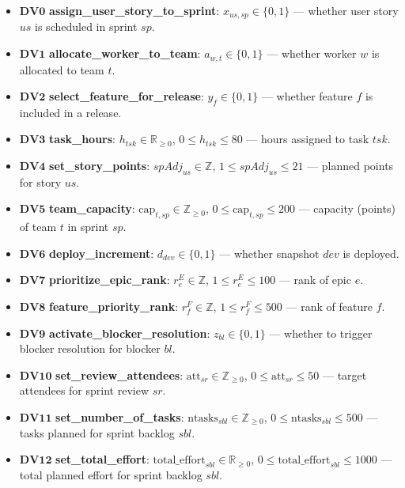 \documentclass[11pt,a4paper]{article}
\begin{document}
\begin{itemize}[leftmargin=2em,label=\(\triangleright\)]
  \item \(\mathbf{DV0}\) \textbf{assign\_user\_story\_to\_sprint}: \(x_{us,sp} \in \{0,1\}\) — whether user story \(us\) is scheduled in sprint \(sp\).
  \item \(\mathbf{DV1}\) \textbf{allocate\_worker\_to\_team}: \(a_{w,t} \in \{0,1\}\) — whether worker \(w\) is allocated to team \(t\).
  \item \(\mathbf{DV2}\) \textbf{select\_feature\_for\_release}: \(y_f \in \{0,1\}\) — whether feature \(f\) is included in a release.
  \item \(\mathbf{DV3}\) \textbf{task\_hours}: \(h_{tsk} \in \mathbb{R}_{\ge 0}\), \(0 \le h_{tsk} \le 80\) — hours assigned to task \(tsk\).
  \item \(\mathbf{DV4}\) \textbf{set\_story\_points}: \(spAdj_{us} \in \mathbb{Z}\), \(1 \le spAdj_{us} \le 21\) — planned points for story \(us\).
  \item \(\mathbf{DV5}\) \textbf{team\_capacity}: \(\text{cap}_{t,sp} \in \mathbb{Z}_{\ge 0}\), \(0 \le \text{cap}_{t,sp} \le 200\) — capacity (points) of team \(t\) in sprint \(sp\).
  \item \(\mathbf{DV6}\) \textbf{deploy\_increment}: \(d_{dev} \in \{0,1\}\) — whether snapshot \(dev\) is deployed.
  \item \(\mathbf{DV7}\) \textbf{prioritize\_epic\_rank}: \(r^{E}_{e} \in \mathbb{Z}\), \(1 \le r^{E}_{e} \le 100\) — rank of epic \(e\).
  \item \(\mathbf{DV8}\) \textbf{feature\_priority\_rank}: \(r^{F}_{f} \in \mathbb{Z}\), \(1 \le r^{F}_{f} \le 500\) — rank of feature \(f\).
  \item \(\mathbf{DV9}\) \textbf{activate\_blocker\_resolution}: \(z_{bl} \in \{0,1\}\) — whether to trigger blocker resolution for blocker \(bl\).
  \item \(\mathbf{DV10}\) \textbf{set\_review\_attendees}: \(\text{att}_{sr} \in \mathbb{Z}_{\ge 0}\), \(0 \le \text{att}_{sr} \le 50\) — target attendees for sprint review \(sr\).
  \item \(\mathbf{DV11}\) \textbf{set\_number\_of\_tasks}: \(\text{ntasks}_{sbl} \in \mathbb{Z}_{\ge 0}\), \(0 \le \text{ntasks}_{sbl} \le 500\) — tasks planned for sprint backlog \(sbl\).
  \item \(\mathbf{DV12}\) \textbf{set\_total\_effort}: \(\text{total\_effort}_{sbl} \in \mathbb{R}_{\ge 0}\), \(0 \le \text{total\_effort}_{sbl} \le 1000\) — total planned effort for sprint backlog \(sbl\).
\end{itemize}
\end{document}
